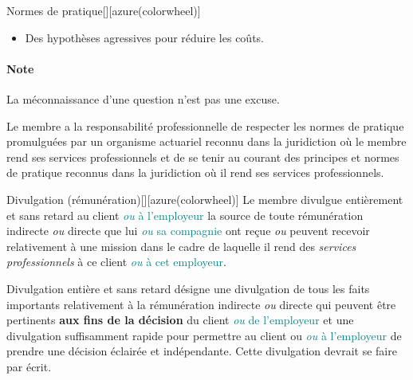 \documentclass[10pt, french]{article}
\begin{document}
\begin{multicols*}{2}
\begin{definitionGENERAL}{Normes de pratique}[][azure(colorwheel)]
\bigskip

\begin{rappel_enhanced}
\begin{itemize}
	\item	Des hypothèses agressives pour réduire les coûts.
\end{itemize}

\paragraph{Note}	La méconnaissance d'une question n'est pas une excuse.
\end{rappel_enhanced}
\end{definitionGENERAL}

\begin{definitionNOHFILLsub}[Annotation 3-1]
Le membre a la responsabilité professionnelle de respecter les normes de pratique promulguées par un organisme actuariel reconnu dans la juridiction où le membre rend ses services professionnels et de se tenir au courant des principes et normes de pratique reconnus dans la juridiction où il rend ses services professionnels.
\end{definitionNOHFILLsub}

\bigskip

\begin{definitionGENERAL}{Divulgation (rémunération)}[][azure(colorwheel)]
Le membre divulgue entièrement et sans retard au client \textcolor{teal}{\textit{ou} à l'employeur} la source de toute rémunération indirecte \textit{ou} directe que lui \textcolor{teal}{\textit{ou} sa compagnie} ont reçue \textit{ou} peuvent recevoir relativement à une mission dans le cadre de laquelle il rend des \og \textit{services professionnels} \fg{} à ce client \textcolor{teal}{\textit{ou} à cet employeur}.
\end{definitionGENERAL}

\begin{definitionNOHFILLsub}[Annotation 4-1]
\og Divulgation entière et sans retard \fg{} désigne une divulgation de tous les faits importants relativement à la rémunération indirecte \textit{ou} directe qui peuvent être pertinents \textbf{aux fins de la décision} du client \textcolor{teal}{\textit{ou} de l'employeur} et une divulgation suffisamment rapide pour permettre au client ou \textcolor{teal}{\textit{ou} à l'employeur} de prendre une décision éclairée et indépendante. Cette divulgation devrait se faire par écrit.
\end{definitionNOHFILLsub}


\end{multicols*}
\end{document}
